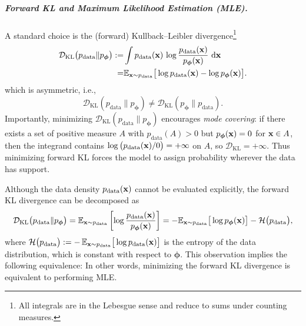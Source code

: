\subparagraph{Forward KL and Maximum Likelihood Estimation (MLE).}
A standard choice is the (forward) Kullback--Leibler divergence\footnote{All integrals are in the Lebesgue sense and reduce to sums under counting measures.}
\begin{align*}
\mathcal{D}_{\mathrm{KL}} \big(p_{\mathrm{data}}\|p_{\bm{\phi}}\big)
  := &\int p_{\mathrm{data}}({\mathbf{x}})\,\log\frac{p_{\mathrm{data}}({\mathbf{x}})}{p_{\bm{\phi}}({\mathbf{x}})}\,\mathop{}\!\mathrm{d} {\mathbf{x}} \\
  = &\mathbb{E}_{{\mathbf{x}}\sim p_{\mathrm{data}}} \big[\log p_{\mathrm{data}}({\mathbf{x}})-\log p_{\bm{\phi}}({\mathbf{x}})\big].
\end{align*}
which is asymmetric, i.e., 
\[
\mathcal{D}_{\mathrm{KL}}(p_{\mathrm{data}} \| p_{\bm{\phi}}) \neq \mathcal{D}_{\mathrm{KL}}(p_{\bm{\phi}} \| p_{\mathrm{data}}).
\]Importantly, minimizing $\mathcal{D}_{\mathrm{KL}}(p_{\mathrm{data}} \| p_{\bm{\phi}})$ encourages \emph{mode covering}: if there exists a set of positive measure $A$ with $p_{\mathrm{data}}(A)>0$ but $p_{\bm{\phi}}({\mathbf{x}})=0$ for ${\mathbf{x}}\in A$, then the integrand contains 
$\log \big(p_{\mathrm{data}}({\mathbf{x}})/0\big)=+\infty$ on $A$, so $\mathcal{D}_{\mathrm{KL}}=+\infty$. 
Thus minimizing forward KL forces the model to assign probability wherever the data has support.

Although the data density $p_{\mathrm{data}}({\mathbf{x}})$ cannot be evaluated explicitly, 
the forward KL divergence can be decomposed as
\begin{align*}
\mathcal{D}_{\mathrm{KL}} \big(p_{\mathrm{data}}\|p_{\bm{\phi}}\big)
  = \mathbb{E}_{{\mathbf{x}} \sim p_{\mathrm{data}}} \left[\log \frac{p_{\mathrm{data}}({\mathbf{x}})}{p_{\bm{\phi}}({\mathbf{x}})}\right] = -\mathbb{E}_{{\mathbf{x}} \sim p_{\mathrm{data}}} \big[\log p_{\bm{\phi}}({\mathbf{x}})\big] 
     - \mathcal H \big(p_{\mathrm{data}}\big),
\end{align*}
where $\mathcal H \big(p_{\mathrm{data}}\big)
:= -\,\mathbb{E}_{{\mathbf{x}} \sim p_{\mathrm{data}}} \big[\log p_{\mathrm{data}}({\mathbf{x}})\big]$
is the entropy of the data distribution, which is constant with respect to $\bm{\phi}$. 
This observation implies the following equivalence:
In other words, minimizing the forward KL divergence is equivalent to performing MLE.

